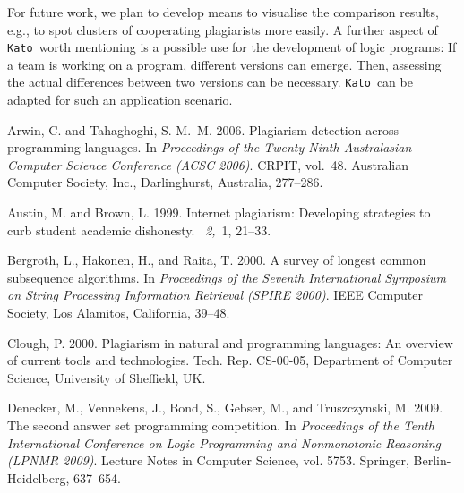 \documentclass{tlp}
\newcommand{\kato}[0]{\texttt{Kato}\xspace}
\begin{document}
 For future work, we plan  to develop means to visualise the comparison results, e.g.,  
 to spot clusters of cooperating plagiarists more easily.
 A further  aspect of \kato\ worth mentioning is a possible use for  the development of logic programs:
 If a team is working on a program, different versions can emerge. Then, assessing 
 the actual differences between two versions can be necessary. \kato\ can be adapted for
such an application scenario.
 


\begin{thebibliography}{}

{\sc Arwin, C.} {\sc and} {\sc Tahaghoghi, S. M.~M.} 2006.
\newblock Plagiarism detection across programming languages.
\newblock In {\em Proceedings of the Twenty-Ninth Australasian Computer Science
  Conference {\rm (}ACSC 2006{\rm )}}. CRPIT, vol.~48. Australian Computer
  Society, Inc., Darlinghurst, Australia, 277--286.

{\sc Austin, M.} {\sc and} {\sc Brown, L.} 1999.
\newblock Internet plagiarism: Developing strategies to curb student academic
  dishonesty.
~{\em 2,\/}~1, 21--33.

{\sc Bergroth, L.}, {\sc Hakonen, H.}, {\sc and} {\sc Raita, T.} 2000.
\newblock A survey of longest common subsequence algorithms.
\newblock In {\em Proceedings of the Seventh International Symposium on String
  Processing Information Retrieval {\rm (}SPIRE 2000{\rm )}}. IEEE Computer
  Society, Los Alamitos, California, 39--48.

{\sc Clough, P.} 2000.
\newblock Plagiarism in natural and programming languages: An overview of
  current tools and technologies.
\newblock Tech. Rep. CS-00-05, Department of Computer Science, University of
  Sheffield, UK.

{\sc Denecker, M.}, {\sc Vennekens, J.}, {\sc Bond, S.}, {\sc Gebser, M.}, {\sc
  and} {\sc Truszczynski, M.} 2009.
\newblock The second answer set programming competition.
\newblock In {\em Proceedings of the Tenth International Conference on Logic
  Programming and Nonmonotonic Reasoning {\rm(}LPNMR 2009{\rm)}}. Lecture Notes
  in Computer Science, vol. 5753. Springer, Berlin-Heidelberg, 637--654.


\end{thebibliography}
\end{document}
